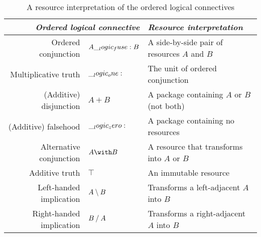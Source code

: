\begin{table}[tbp]
  \centering
  \begin{tabular}{@{}rll@{}}
    \toprule
    \multicolumn{2}{r}{\emph{Ordered logical connective}} %
      & \emph{Resource interpretation}
    \\ \midrule
    Ordered conjunction & $A \__logic_fuse: B$ & A side-by-side pair of resources $A$ and $B$ %
    \\
    Multiplicative truth & $\__logic_one:$ & The unit of ordered conjunction 
    \\
    (Additive) disjunction & $A \plus B$ & %
      A package containing  $A$ or $B$ (not both)
    \\
    (Additive) falsehood & $\__logic_zero:$ & A package containing no resources 
    \\
    Alternative conjunction & $A \with B$ &%
      A resource that transforms into $A$ or $B$
    \\
    Additive truth & $\top$ & An immutable resource
    \\
    Left-handed implication & $A \mathbin { \setminus } B$ & %
      Transforms a left-adjacent %
      $A$ into %
      $B$ \\
    Right-handed implication & $B \mathbin { / } A$ & %
      Transforms a right-adjacent %
      $A$ into %
      $B$ \\
    \bottomrule
  \end{tabular}
  \caption{A resource interpretation of the ordered logical connectives}\label{tbl:ordered-logic:resources}
\end{table}


